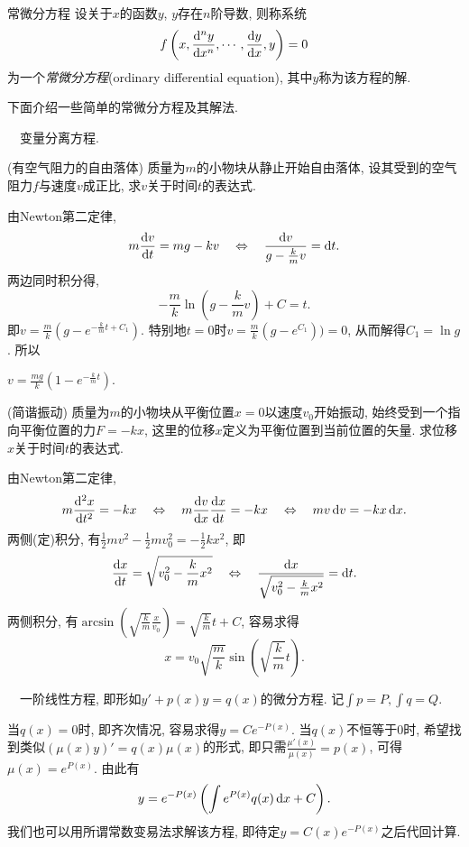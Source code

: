 \begin{definition}{常微分方程}
	设关于$x$的函数$y$, $y$存在$n$阶导数, 则称系统$$f\left( x,\frac{\mathop{}\!\mathrm{d} ^n y}{\mathop{}\!\mathrm{d} x^n},\cdots ,\frac{\mathop{}\!\mathrm{d} y}{\mathop{}\!\mathrm{d} x},y \right)=0$$
	为一个\textit{常微分方程}(ordinary differential equation), 其中$y$称为该方程的解. 
\end{definition}

下面介绍一些简单的常微分方程及其解法. 

~~变量分离方程. 

\begin{example}
	(有空气阻力的自由落体) 质量为$m$的小物块从静止开始自由落体, 设其受到的空气阻力$f$与速度$v$成正比, 求$v$关于时间$t$的表达式. 
\end{example}
\begin{solution}
	由Newton第二定律, $$m \frac{\mathop{}\!\mathrm{d} v}{\mathop{}\!\mathrm{d} t} =mg-kv \quad \Leftrightarrow \quad \frac{\mathop{}\!\mathrm{d} v}{g-\frac{k}{m} v} = \mathop{}\!\mathrm{d} t.$$
	两边同时积分得, $$-\frac{m}{k} \ln \left(g-\frac{k}{m}v \right)+C=t.$$
	即$v=\frac{m}{k}(g-e^{-\frac{k}{m}t+C_1})$. 特别地$t=0$时$v=\frac{m}{k}(g-e^{C_1}))=0$, 从而解得$C_1=\ln g$. 所以
	\begin{center}
		$\displaystyle v = \frac{mg}{k}(1-e^{-\frac{k}{m}t}).$
	\end{center}
\end{solution}

\begin{example}
	(简谐振动) 质量为$m$的小物块从平衡位置$x=0$以速度$v_0$开始振动, 始终受到一个指向平衡位置的力$F=-kx$, 这里的位移$x$定义为平衡位置到当前位置的矢量. 求位移$x$关于时间$t$的表达式. 
\end{example}
\begin{solution}
	由Newton第二定律, $$m \frac{\dif ^2x}{\dif t^2} = -kx \quad \Leftrightarrow \quad m \frac{\dif v}{\dif x} \frac{\dif x}{\dif t} = -kx \quad \Leftrightarrow \quad mv\dif v=-kx\dif x.$$
	两侧(定)积分, 有$\frac{1}{2}mv^2-\frac{1}{2}mv_0^2 = -\frac{1}{2}kx^2$, 即$$\frac{\mathop{}\!\mathrm{d} x}{\mathop{}\!\mathrm{d} t} = \sqrt{v_0^2-\frac{k}{m}x^2} \quad \Leftrightarrow \quad \frac{\mathop{}\!\mathrm{d} x}{\sqrt{v_0^2-\frac{k}{m}x^2}} = \mathop{}\!\mathrm{d} t.$$
	两侧积分, 有$\arcsin (\sqrt{\frac{k}{m}} \frac{x}{v_0}) = \sqrt{\frac{k}{m}} t+C$, 容易求得$$x = v_0\sqrt{\frac{m}{k}}\sin \left( \sqrt{\frac{k}{m}}t \right).$$
\end{solution}

~~一阶线性方程, 即形如$y' + p(x)y=q(x)$的微分方程. 记$\int p = P, \int q = Q$. 

当$q(x)=0$时, 即齐次情况, 容易求得$y=Ce^{-P(x)}$. 当$q(x)$不恒等于$0$时, 希望找到类似$(\mu (x) y)'=q(x)\mu (x)$的形式, 即只需$\frac{\mu '(x)}{\mu (x)} = p(x)$, 可得$\mu (x) = e^{P(x)}$. 由此有$$y=e^{-P(x)}\left( \int e^{P(x)}q(x) \mathop{}\!\mathrm{d} x + C \right).$$
我们也可以用所谓常数变易法求解该方程, 即待定$y=C(x)e^{-P(x)}$之后代回计算. 

